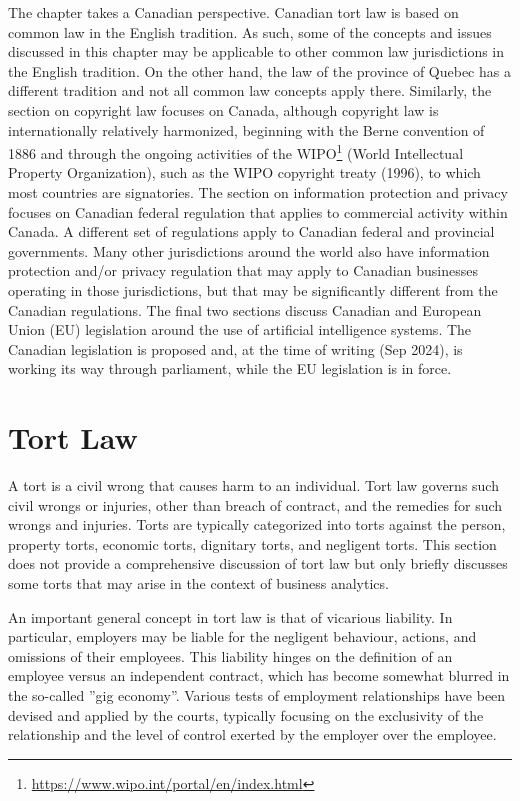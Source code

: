 The chapter takes a Canadian perspective. Canadian tort law is based on common law in the English tradition. As such, some of the concepts and issues discussed in this chapter may be applicable to other common law jurisdictions in the English tradition. On the other hand, the law of the province of Quebec has a different tradition and not all common law concepts apply there. Similarly, the section on copyright law focuses on Canada, although copyright law is internationally relatively harmonized, beginning with the Berne convention of 1886 and through the ongoing activities of the WIPO\footnote{\url{https://www.wipo.int/portal/en/index.html}}  (World Intellectual Property Organization), such as the WIPO copyright treaty (1996), to which most countries are signatories. The section on information protection and privacy focuses on Canadian federal regulation that applies to commercial activity within Canada. A different set of regulations apply to Canadian federal and provincial governments. Many other jurisdictions around the world also have information protection and/or privacy regulation that may apply to Canadian businesses operating in those jurisdictions, but that may be significantly different from the Canadian regulations. The final two sections discuss Canadian and European Union (EU) legislation around the use of artificial intelligence systems. The Canadian legislation is proposed and, at the time of writing (Sep 2024), is working its way through parliament, while the EU legislation is in force. 

\section{Tort Law}

A tort  is a civil wrong that causes harm to an individual. Tort law governs such civil wrongs or injuries, other than breach of contract, and the remedies for such wrongs and injuries. Torts are typically categorized into torts against the person, property torts, economic torts, dignitary torts, and negligent torts. This section does not provide a comprehensive discussion of tort law but only briefly discusses some torts that may arise in the context of business analytics. 

An important general concept in tort law is that of vicarious liability. In particular, employers may be liable for the negligent behaviour, actions, and omissions of their employees. This liability hinges on the definition of an employee versus an independent contract, which has become somewhat blurred in the so-called ''gig economy''. Various tests of employment relationships have been devised and applied by the courts, typically focusing on the exclusivity of the relationship and the level of control exerted by the employer over the employee. 

